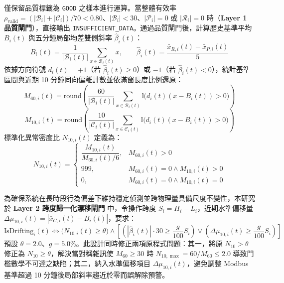 \documentclass[fontset=none, a4paper, 12pt]{ctexart}
\begin{document}
\begin{doublespace}
僅保留品質標籤為 \texttt{GOOD} 之樣本進行運算。當整體有效率 $\rho_{\mathrm{valid}} = (|\mathcal{B}_i|+|\mathcal{C}_i|)/70 < 0.80$、$|\mathcal{B}_i|<30$、$|\mathcal{P}_i|=0$ 或 $|\mathcal{R}_i|=0$ 時（\textbf{Layer 1 品質閘門}），直接輸出 \texttt{INSUFFICIENT\_DATA}。通過品質閘門後，計算歷史基準平均 $B_i(t)$ 與五分鐘局部均差雙側斜率 $\hat{\beta}_i(t)$：
\begin{equation}
B_i(t) = \frac{1}{|\mathcal{B}_i(t)|}\sum_{x\in\mathcal{B}_i(t)} x, \qquad
\hat{\beta}_i(t) = \frac{\bar{x}_{R,i}(t) - \bar{x}_{P,i}(t)}{5}
\label{eq:base_slope}
\end{equation}
依據方向符號 $d_i(t) = +1$（若 $\hat{\beta}_i(t)\ge 0$）或 $-1$（若 $\hat{\beta}_i(t)<0$），統計基準區間與近期 10 分鐘同向偏離計數並依滿窗長度比例還原：
\begin{equation}
M_{60,i}(t) = \mathrm{round}\!\left(\frac{60}{|\mathcal{B}_i(t)|}\sum_{x\in\mathcal{B}_i(t)} \mathbb{I}\!\bigl(d_i(t)(x - B_i(t)) > 0\bigr)\right)
\end{equation}
\begin{equation}
M_{10,i}(t) = \mathrm{round}\!\left(\frac{10}{|\mathcal{C}_i(t)|}\sum_{x\in\mathcal{C}_i(t)} \mathbb{I}\!\bigl(d_i(t)(x - B_i(t)) > 0\bigr)\right)
\end{equation}
標準化異常密度比 $N_{10,i}(t)$ 定義為：
\begin{equation}
N_{10,i}(t) = \begin{cases}
\dfrac{M_{10,i}(t)}{M_{60,i}(t)/6}, & M_{60,i}(t) > 0 \\[8pt]
999, & M_{60,i}(t)=0 \land M_{10,i}(t)>0 \\
0, & M_{60,i}(t)=0 \land M_{10,i}(t)=0
\end{cases}
\label{eq:n10}
\end{equation}

為確保系統在長時段行為偏差下維持穩定偵測並跨物理量具備尺度不變性，本研究於 \textbf{Layer 2 跨度歸一化漂移閘門} 中，令操作跨度 $S_i = H_i - L_i$，近期水準偏移量 $\Delta \mu_{10,i}(t) = |\bar{x}_{C,i}(t) - B_i(t)|$，要求：
\begin{equation}
\mathrm{IsDrifting}_i(t) \iff \bigl(N_{10,i}(t) \ge \theta\bigr) \land \left[\left(|\hat{\beta}_i(t)|\cdot 30 \ge \frac{g}{100}S_i\right) \lor \left(\Delta \mu_{10,i}(t) \ge \frac{g}{100}S_i\right)\right]
\label{eq:drift_gate}
\end{equation}
預設 $\theta = 2.0$、$g = 5.0\%$。此設計同時修正兩項原程式問題：其一，將原 $N_{10} > \theta$ 修正為 $N_{10} \ge \theta$，解決當對稱雜訊使 $M_{60} \ge 30$ 時 $N_{10,\max}=60/M_{60} \le 2.0$ 導致門檻數學不可達之缺陷；其二，納入水準偏移項目 $\Delta\mu_{10,i}(t)$，避免調整 Modbus 基準超過 10 分鐘後局部斜率趨近於零而誤解除預警。


\end{doublespace}
\end{document}
